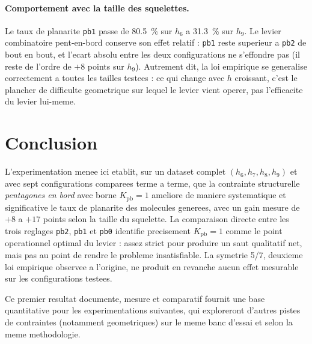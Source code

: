 \documentclass[11pt,a4paper]{article}
\begin{document}
\paragraph{Comportement avec la taille des squelettes.}
Le taux de planarite \texttt{pb1} passe de 80.5~\% sur $h_6$ a 31.3~\%
sur $h_9$. Le levier combinatoire pent-en-bord conserve son effet
relatif : \texttt{pb1} reste superieur a \texttt{pb2} de bout en bout,
et l'ecart absolu entre les deux configurations ne s'effondre pas (il
reste de l'ordre de $+8$ points sur $h_9$). Autrement dit, la loi
empirique se generalise correctement a toutes les tailles testees : ce
qui change avec $h$ croissant, c'est le plancher de difficulte
geometrique sur lequel le levier vient operer, pas l'efficacite du
levier lui-meme.

\section{Conclusion}

L'experimentation menee ici etablit, sur un dataset complet
$(h_6, h_7, h_8, h_9)$ et avec sept configurations comparees terme a
terme, que la contrainte structurelle \emph{pentagones en bord} avec
borne $K_{\text{pb}} = 1$ ameliore de maniere systematique et
significative le taux de planarite des molecules generees, avec un
gain mesure de $+8$ a $+17$ points selon la taille du squelette. La
comparaison directe entre les trois reglages \texttt{pb2}, \texttt{pb1}
et \texttt{pb0} identifie precisement $K_{\text{pb}} = 1$ comme le
point operationnel optimal du levier : assez strict pour produire un
saut qualitatif net, mais pas au point de rendre le probleme
insatisfiable. La symetrie 5/7, deuxieme loi empirique observee a
l'origine, ne produit en revanche aucun effet mesurable sur les
configurations testees.

Ce premier resultat documente, mesure et comparatif fournit une base
quantitative pour les experimentations suivantes, qui exploreront
d'autres pistes de contraintes (notamment geometriques) sur le meme
banc d'essai et selon la meme methodologie.
\end{document}
